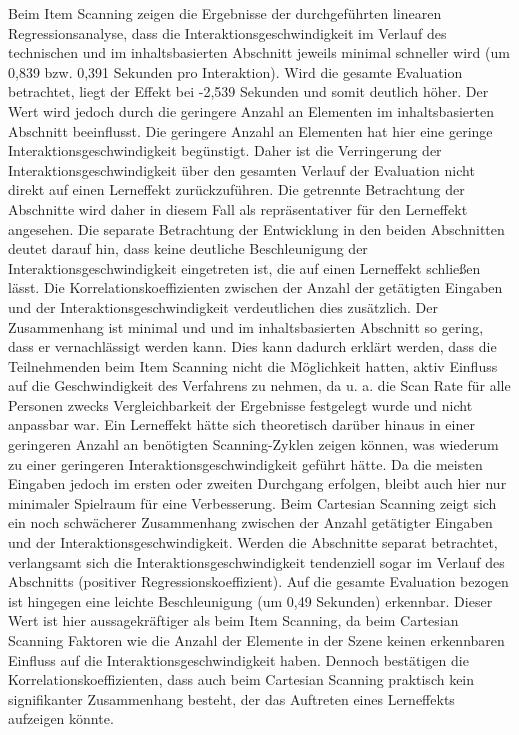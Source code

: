 Beim Item Scanning zeigen die Ergebnisse der durchgeführten linearen Regressionsanalyse, dass die Interaktionsgeschwindigkeit im Verlauf des technischen und im inhaltsbasierten Abschnitt jeweils minimal schneller wird (um 0,839 bzw. 0,391 Sekunden pro Interaktion). Wird die gesamte Evaluation betrachtet, liegt der Effekt bei -2,539 Sekunden und somit deutlich höher. Der Wert wird jedoch durch die geringere Anzahl an Elementen im inhaltsbasierten Abschnitt beeinflusst. Die geringere Anzahl an Elementen hat hier eine geringe Interaktionsgeschwindigkeit begünstigt. Daher ist die Verringerung der Interaktionsgeschwindigkeit über den gesamten Verlauf der Evaluation nicht direkt auf einen Lerneffekt zurückzuführen. Die getrennte Betrachtung der Abschnitte wird daher in diesem Fall als repräsentativer für den Lerneffekt angesehen. Die separate Betrachtung der Entwicklung in den beiden Abschnitten deutet darauf hin, dass keine deutliche Beschleunigung der Interaktionsgeschwindigkeit eingetreten ist, die auf einen Lerneffekt schließen lässt. Die Korrelationskoeffizienten zwischen der Anzahl der getätigten Eingaben und der Interaktionsgeschwindigkeit verdeutlichen dies zusätzlich. Der Zusammenhang ist minimal und und im inhaltsbasierten Abschnitt so gering, dass er vernachlässigt werden kann. Dies kann dadurch erklärt werden, dass die Teilnehmenden beim Item Scanning nicht die Möglichkeit hatten, aktiv Einfluss auf die Geschwindigkeit des Verfahrens zu nehmen, da u. a. die Scan Rate für alle Personen zwecks Vergleichbarkeit der Ergebnisse festgelegt wurde und nicht anpassbar war. Ein Lerneffekt hätte sich theoretisch darüber hinaus in einer geringeren Anzahl an benötigten Scanning-Zyklen zeigen können, was wiederum zu einer geringeren Interaktionsgeschwindigkeit geführt hätte. Da die meisten Eingaben jedoch im ersten oder zweiten Durchgang erfolgen, bleibt auch hier nur minimaler Spielraum für eine Verbesserung.
Beim Cartesian Scanning zeigt sich ein noch schwächerer Zusammenhang zwischen der Anzahl getätigter Eingaben und der Interaktionsgeschwindigkeit. Werden die Abschnitte separat betrachtet, verlangsamt sich die Interaktionsgeschwindigkeit tendenziell sogar im Verlauf des Abschnitts (positiver Regressionskoeffizient). Auf die gesamte Evaluation bezogen ist hingegen eine leichte Beschleunigung (um 0,49 Sekunden) erkennbar. Dieser Wert ist hier aussagekräftiger als beim Item Scanning, da beim Cartesian Scanning Faktoren wie die Anzahl der Elemente in der Szene keinen erkennbaren Einfluss auf die Interaktionsgeschwindigkeit haben. Dennoch bestätigen die Korrelationskoeffizienten, dass auch beim Cartesian Scanning praktisch kein signifikanter Zusammenhang besteht, der das Auftreten eines Lerneffekts aufzeigen könnte.

